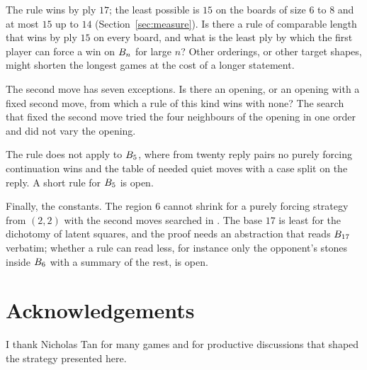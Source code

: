 \documentclass[11pt]{amsart}
\theoremstyle{definition}
\theoremstyle{remark}
\begin{document}
The rule wins by ply $17$; the least possible is $15$ on the boards
of size $6$ to $8$ and at most $15$ up to $14$ (Section~\ref{sec:measure}).
Is there a rule of comparable length that wins by ply $15$ on every
board, and what is the least ply by which the first player can force
a win on $B_n$ for large $n$? Other orderings, or other target shapes, might
shorten the longest games at the cost of a longer statement.

The second move has seven exceptions. Is there an opening, or an
opening with a fixed second move, from which a rule of this kind wins
with none? The search that fixed the second move tried the four
neighbours of the opening in one order and did not vary the opening.

The rule does not apply to $B_5$, where from twenty reply pairs
no purely forcing continuation wins and the table of
\cite{reid-threshold} needed quiet moves with a case split on the
reply. A short rule for $B_5$ is open.

Finally, the constants. The region $6$ cannot shrink for a purely
forcing strategy from $(2,2)$ with the second moves searched in
\cite{reid-threshold}. The base $17$ is least for the dichotomy of
latent squares, and the proof needs an abstraction that reads
$B_{17}$ verbatim; whether a rule can read less, for instance
only the opponent's stones inside $B_6$ with a summary of the
rest, is open.

\section*{Acknowledgements}

I thank Nicholas Tan for many games and for productive discussions
that shaped the strategy presented here.



\end{document}
